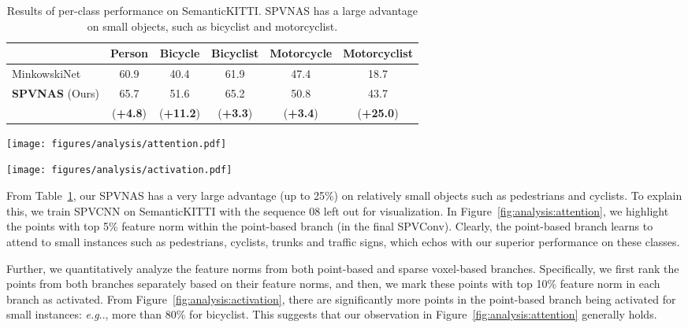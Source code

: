 \documentclass[runningheads]{llncs}
\makeatletter
\newcommand{\fig}[1]{Figure~\ref{#1}}
\newcommand{\tab}[1]{Table~\ref{#1}}
\DeclareRobustCommand\onedot{\futurelet\@let@token\@onedot}
\def\@onedot{\ifx\@let@token.\else.\null\fi\xspace}
\def\eg{\emph{e.g}\onedot} \def\Eg{\emph{E.g}\onedot}
\def\ie{\emph{i.e}\onedot} \def\Ie{\emph{I.e}\onedot}
\def\moduleshort{SPVConv\xspace}
\def\cnnshort{SPVCNN\xspace}
\def\modelshort{SPVNAS\xspace}
\makeatother
\begin{document}
\begin{table}[t]
\setlength{\tabcolsep}{7pt}
\small\centering
\begin{tabular}{lccccc}
    \toprule
     & Person & Bicycle & Bicyclist & Motorcycle & Motorcyclist \\
    \midrule
    MinkowskiNet~\cite{choy20194d} & 60.9 & 40.4 & 61.9 & 47.4 & 18.7 \\
    \midrule
    \multirow{2}{*}{\textbf{\modelshort} (Ours)} & 65.7 & 51.6 & 65.2 & 50.8 & 43.7 \\
    & (\textbf{+4.8}) & (\textbf{+11.2}) & (\textbf{+3.3}) & (\textbf{+3.4}) & (\textbf{+25.0}) \\
    \bottomrule
\end{tabular}
\caption{Results of per-class performance on SemanticKITTI. \modelshort has a large advantage on small objects, such as bicyclist and motorcyclist.}
\label{tab:analysis:classes}
\end{table} \begin{figure*}[t]
\texttt{[image: figures/analysis/attention.pdf]}
\caption{The point-based branch learns to put its attention on small instances (\ie, pedestrians, cyclists, traffic signs). Here, the points in red are the ones with the top 5\% largest feature norm in the point-based branch.}
\label{fig:analysis:attention}
\end{figure*} \begin{figure*}[t]
\texttt{[image: figures/analysis/activation.pdf]}
\caption{Average percentage of activated points in point-based and sparse voxel-based branches for all 19 classes in SemanticKITTI~\cite{behley2019semantickitti}: the point-based branch attends to smaller objects as the red bars are much higher.}
\label{fig:analysis:activation}
\end{figure*} 
From \tab{tab:analysis:classes}, our \modelshort has a very large advantage (up to 25\%) on relatively small objects such as pedestrians and cyclists. To explain this, we train \cnnshort on SemanticKITTI with the sequence 08 left out for visualization. In \fig{fig:analysis:attention}, we highlight the points with top 5\% feature norm within the point-based branch (in the final \moduleshort). Clearly, the point-based branch learns to attend to small instances such as pedestrians, cyclists, trunks and traffic signs, which echos with our superior performance on these classes.

Further, we quantitatively analyze the feature norms from both point-based and sparse voxel-based branches. Specifically, we first rank the points from both branches separately based on their feature norms, and then, we mark these points with top 10\% feature norm in each branch as activated. From \fig{fig:analysis:activation}, there are significantly more points in the point-based branch being activated for small instances: \eg, more than 80\% for bicyclist. This suggests that our observation in \fig{fig:analysis:attention} generally holds.
\end{document}
